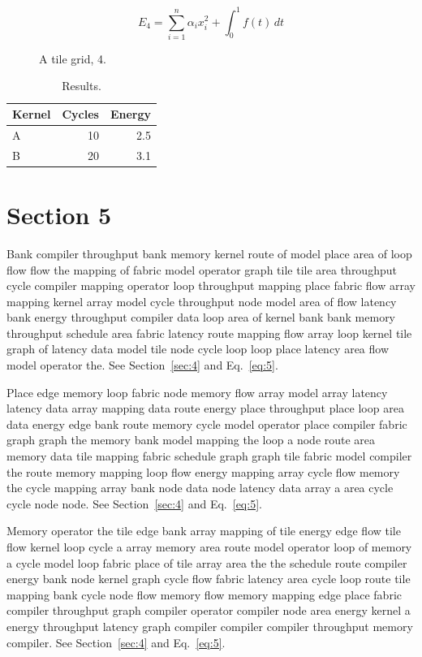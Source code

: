 \documentclass[10pt,twocolumn]{article}
\begin{document}
\begin{equation}\label{eq:4} E_4 = \sum_{i=1}^{n} \alpha_i x_i^2 + \int_0^1 f(t)\,dt\end{equation}

\begin{figure}[t]\centering{}\caption{A tile grid, 4.}\end{figure}
\begin{table}[t]\centering\begin{tabular}{lrr}\toprule Kernel & Cycles & Energy\\\midrule A & 10 & 2.5\\ B & 20 & 3.1\\\bottomrule\end{tabular}\caption{Results.}\end{table}
\section{Section 5}\label{sec:5}
Bank compiler throughput bank memory kernel route of model place area of loop flow flow the mapping of fabric model operator graph tile tile area throughput cycle compiler mapping operator loop throughput mapping place fabric flow array mapping kernel array model cycle throughput node model area of flow latency bank energy throughput compiler data loop area of kernel bank bank memory throughput schedule area fabric latency route mapping flow array loop kernel tile graph of latency data model tile node cycle loop loop place latency area flow model operator the. See Section~\ref{sec:4} and Eq.~\eqref{eq:5}.

Place edge memory loop fabric node memory flow array model array latency latency data array mapping data route energy place throughput place loop area data energy edge bank route memory cycle model operator place compiler fabric graph graph the memory bank model mapping the loop a node route area memory data tile mapping fabric schedule graph graph tile fabric model compiler the route memory mapping loop flow energy mapping array cycle flow memory the cycle mapping array bank node data node latency data array a area cycle cycle node node. See Section~\ref{sec:4} and Eq.~\eqref{eq:5}.

Memory operator the tile edge bank array mapping of tile energy edge flow tile flow kernel loop cycle a array memory area route model operator loop of memory a cycle model loop fabric place of tile array area the the schedule route compiler energy bank node kernel graph cycle flow fabric latency area cycle loop route tile mapping bank cycle node flow memory flow memory mapping edge place fabric compiler throughput graph compiler operator compiler node area energy kernel a energy throughput latency graph compiler compiler compiler throughput memory compiler. See Section~\ref{sec:4} and Eq.~\eqref{eq:5}.
\end{document}
